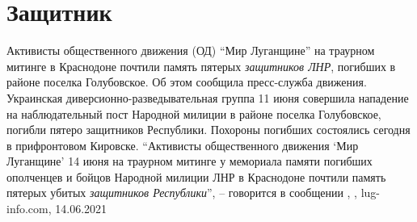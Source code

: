  
 
 
 
 
\chapter{Защитник}

Активисты общественного движения (ОД) \enquote{Мир Луганщине} на траурном
митинге в Краснодоне почтили память пятерых \emph{защитников ЛНР}, погибших в
районе поселка Голубовское. Об этом сообщила пресс-служба движения.  Украинская
диверсионно-разведывательная группа 11 июня совершила нападение на
наблюдательный пост Народной милиции в районе поселка Голубовское, погибли
пятеро защитников Республики. Похороны погибших состоялись сегодня в
прифронтовом Кировске.  \enquote{Активисты общественного движения \enquote{Мир
Луганщине} 14 июня на траурном митинге у мемориала памяти погибших ополченцев и
бойцов Народной милиции ЛНР в Краснодоне почтили память пятерых убитых
\emph{защитников Республики}}, – говорится в сообщении
, , lug-info.com,
14.06.2021

